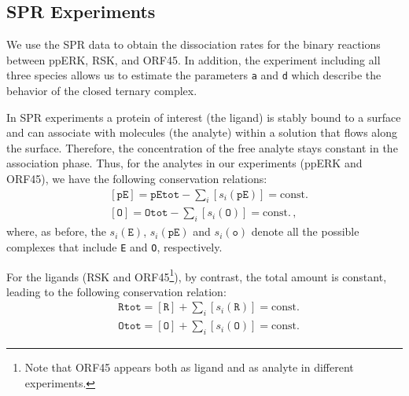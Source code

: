 \documentclass[12pt]{article}
\begin{document}
	\subsection{SPR Experiments}
	We use the SPR data to obtain the dissociation rates for the binary
	reactions between ppERK, RSK, and ORF45. In addition, the experiment
	including all three species allows us to estimate the parameters \texttt{a}
	and \texttt{d} which describe the behavior of the closed ternary complex.
	
	In SPR experiments a protein of interest (the ligand) is stably bound
	to a surface and can associate with molecules (the analyte) within
	a solution that flows along the surface. Therefore, the concentration of the free analyte stays constant in the association phase. Thus, for the analytes in our experiments (ppERK and ORF45), we have
	the following conservation relations: 
	\begin{align}
		& [\texttt{pE}]=\texttt{pEtot}-\sum_{i}[s_{i}(\texttt{pE})]=\text{const.}\\
		& [\texttt{O}]=\texttt{Otot}-\sum_{i}[s_{i}(\texttt{O})]=\text{const.}\,,
	\end{align}
	where, as before, the $s_{i}(\texttt{E})$, $s_{i}(\texttt{pE})$
	and $s_{i}(\texttt{o})$ denote all the possible complexes that include
	\texttt{E} and \texttt{O}, respectively.
	
	For the ligands (RSK and ORF45\footnote{Note that ORF45 appears both as ligand and as analyte in different
		experiments.}), by contrast, the total amount is constant, leading to the following
	conservation relation: 
	\begin{align}
		& \texttt{Rtot}=[\texttt{R}]+\sum_{i}[s_{i}(\texttt{R})]=\text{const.}\\
		& \texttt{Otot}=[\texttt{O}]+\sum_{i}[s_{i}(\texttt{O})]=\text{const.}
	\end{align}
	
\end{document}
